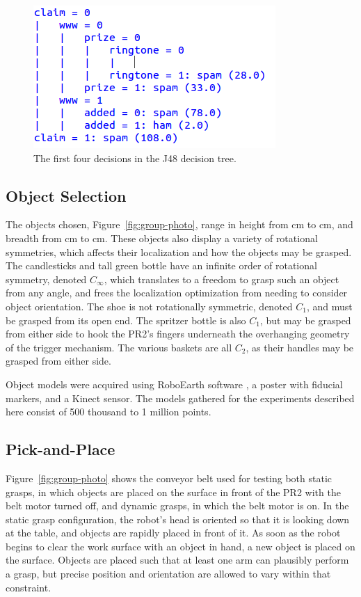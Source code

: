 \documentclass[letterpaper, 10 pt, conference]{ieeeconf}  %
\begin{document}
\begin{figure}[t]
\centering
\includegraphics[width=0.8\columnwidth]{figures/J48.png}
\caption{
The first four decisions in the J48 decision tree.
}
\end{figure}
\subsection{Object Selection}
The objects chosen, Figure~\ref{fig:group-photo}, range in height from
\unit[15]{cm} to \unit[45]{cm}, and breadth from \unit[8]{cm} to
\unit[25]{cm}. These objects also display a variety of rotational
symmetries, which affects their localization and how the objects may
be grasped. The candlesticks and tall green bottle have an infinite
order of rotational symmetry, denoted $C_\infty$, which translates to
a freedom to grasp such an object from any angle, and frees the
localization optimization from needing to consider object
orientation. The shoe is not rotationally symmetric, denoted $C_1$,
and must be grasped from its open end. The spritzer bottle is also
$C_1$, but may be grasped from either side to hook the PR2's fingers
underneath the overhanging geometry of the trigger mechanism. The
various baskets are all $C_2$, as their handles may be grasped from
either side.

Object models were acquired using RoboEarth software
\cite{DiMarco2012:RoboEarthModel}, a poster with fiducial markers, and
a Kinect sensor. The models gathered for the experiments described
here consist of 500 thousand to 1 million points.

\subsection{Pick-and-Place}
Figure~\ref{fig:group-photo} shows the conveyor belt used for testing
both static grasps, in which objects are placed on the surface in
front of the PR2 with the belt motor turned off, and dynamic grasps,
in which the belt motor is on. In the static grasp configuration, the
robot's head is oriented so that it is looking down at the table, and
objects are rapidly placed in front of it. As soon as the robot begins
to clear the work surface with an object in hand, a new object is
placed on the surface. Objects are placed such that at least one arm
can plausibly perform a grasp, but precise position and orientation
are allowed to vary within that constraint.
\end{document}
